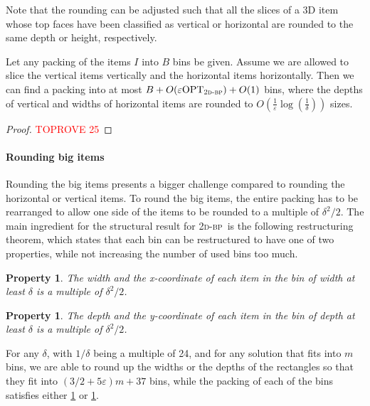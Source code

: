 \documentclass[a4paper,UKenglish,cleveref, autoref, thm-restate]{lipics-v2021}
\newcommand{\eps}{\varepsilon}
\newcommand{\opt}{\mathrm{OPT}}
\newcommand{\twobp}{\textsc{2d-bp}\xspace}
\newcommand{\bigy}{big\xspace}
\newtheorem{property}[theorem]{Property}
\begin{document}
Note that the rounding can be adjusted such that all the slices of a 3D item whose top faces have been classified as vertical or horizontal are rounded to the same depth or height, respectively.

\begin{lemma}
\label{lem:rounding-vert-hor-items-2bp}
Let any packing of the items $I$ into $B$ bins be given.
Assume we are allowed to slice the vertical items vertically and the horizontal items horizontally.
Then we can find a packing into at most $B + O(\eps \opt_{\twobp}) +O(1)$ bins, where the depths of vertical and widths of horizontal items are rounded to $O(\frac{1}{\eps}\log(\frac{1}{\delta}))$ sizes.
\end{lemma}
\begin{proof}\textcolor{red}{TOPROVE 25}\end{proof}

\paragraph*{Rounding \bigy items}
Rounding the \bigy items presents a bigger challenge compared to rounding the horizontal or vertical items.
To round the \bigy items, the entire packing has to be rearranged to allow one side of the items to be rounded to a multiple of $\delta^2/2$.
The main ingredient for the structural result for \twobp~is the following restructuring theorem, which states that each bin can be restructured to have one of two properties, while not increasing the number of used bins too much.

\begin{property}
\label{prop1}
The width and the x-coordinate of each item in the bin of width at least $\delta$ is a multiple of $\delta^2/2$.
\end{property}

\begin{property}
\label{prop2}
The depth and the y-coordinate of each item in the bin of depth at least $\delta$ is a multiple of $\delta^2/2$.
\end{property}
\begin{theorem}
\label{thm:2d-bin-packing-repacking-structure}
    For any $\delta$, with $1/\delta$ being a multiple of 24, and for any solution that fits into $m$ bins, we are able to round up the widths or the depths of the rectangles so that they ﬁt into $(3/2 +5\eps)m +37$ bins, while the packing of each of the bins satisfies either \cref{prop1} or \cref{prop2}.
\end{theorem}
\end{document}
